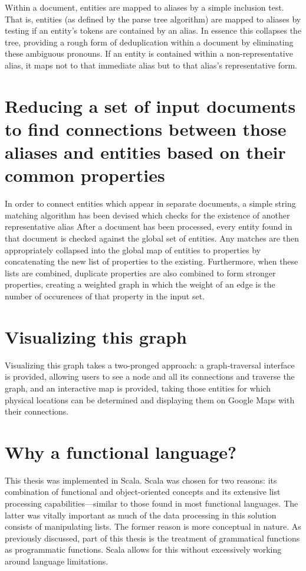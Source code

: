 Within a document, entities are mapped to aliases by a simple inclusion test.  That is, entities (as defined by the parse tree algorithm) are mapped to aliases by testing if an entity's tokens are contained by an alias.  In essence this collapses the tree, providing a rough form of deduplication within a document by eliminating these ambiguous pronouns.  If an entity is contained within a non-representative alias, it maps not to that immediate alias but to that alias's representative form.   

\section{Reducing a set of input documents to find connections between those aliases and entities based on their common properties}

In order to connect entities which appear in separate documents, a simple string matching algorithm has been devised which checks for the existence of another representative alias   After a document has been processed, every entity found in that document is checked against the global set of entities.  Any matches are then appropriately collapsed into the global map of entities to properties by concatenating the new list of properties to the existing.  Furthermore, when these lists are combined, duplicate properties are also combined to form stronger properties, creating a weighted graph in which the weight of an edge is the number of occurences of that property in the input set.  


\section{Visualizing this graph}

Visualizing this graph takes a two-pronged approach: a graph-traversal interface is provided, allowing users to see a node and all its connections and traverse the graph, and an interactive map is provided, taking those entities for which physical locations can be determined and displaying them on Google Maps with their connections.

\section{Why a functional language?}
\label{sec:why-scala}

This thesis was implemented in Scala.  Scala was chosen for two reasons: its combination of functional and object-oriented concepts and its extensive list processing capabilities---similar to those found in most functional languages.  The latter was vitally important as much of the data processing in this solution consists of manipulating lists.  The former reason is more conceptual in nature.  As previously discussed, part of this thesis is the treatment of grammatical functions as programmatic functions.  Scala allows for this without excessively working around language limitations.

